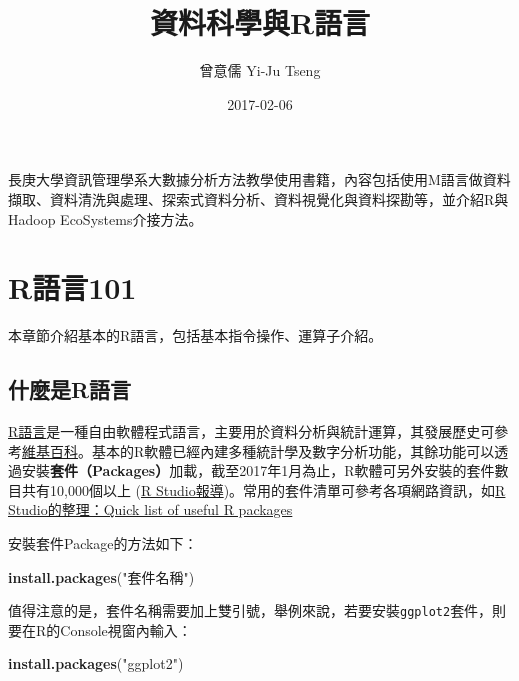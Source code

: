 \documentclass[]{book}
\title{資料科學與R語言}
\author{曾意儒 Yi-Ju Tseng}
\date{2017-02-06}
\newenvironment{Shaded}{\begin{snugshade}}{\end{snugshade}}
\newcommand{\KeywordTok}[1]{\textcolor[rgb]{0.13,0.29,0.53}{\textbf{{#1}}}}
\newcommand{\StringTok}[1]{\textcolor[rgb]{0.31,0.60,0.02}{{#1}}}
\newcommand{\NormalTok}[1]{{#1}}
\theoremstyle{definition}
\theoremstyle{definition}
\theoremstyle{remark}
\begin{document}
\maketitle

{
\setcounter{tocdepth}{1}
\tableofcontents
}
\chapter*{}\label{preface}

長庚大學資訊管理學系大數據分析方法教學使用書籍，內容包括使用M語言做資料擷取、資料清洗與處理、探索式資料分析、資料視覺化與資料探勘等，並介紹R與Hadoop
EcoSystems介接方法。

\chapter{R語言101}\label{intro}

本章節介紹基本的R語言，包括基本指令操作、運算子介紹。

\section{什麼是R語言}\label{r}

\href{http://www.r-project.org/}{R語言}是一種自由軟體程式語言，主要用於資料分析與統計運算，其發展歷史可參考\href{https://zh.wikipedia.org/wiki/R\%E8\%AF\%AD\%E8\%A8\%80}{維基百科}。基本的R軟體已經內建多種統計學及數字分析功能，其餘功能可以透過安裝\textbf{套件（Packages）}加載，截至2017年1月為止，R軟體可另外安裝的套件數目共有10,000個以上
(\href{https://www.rstudio.com/rviews/2017/01/06/10000-cran-packages/}{R
Studio報導})。常用的套件清單可參考各項網路資訊，如\href{https://support.rstudio.com/hc/en-us/articles/201057987-Quick-list-of-useful-R-packages}{R
Studio的整理：Quick list of useful R packages}

安裝套件Package的方法如下：

\begin{Shaded}
\begin{Highlighting}[]
\KeywordTok{install.packages}\NormalTok{(}\StringTok{"套件名稱"}\NormalTok{)}
\end{Highlighting}
\end{Shaded}

值得注意的是，套件名稱需要加上雙引號，舉例來說，若要安裝\texttt{ggplot2}套件，則要在R的Console視窗內輸入：

\begin{Shaded}
\begin{Highlighting}[]
\KeywordTok{install.packages}\NormalTok{(}\StringTok{"ggplot2"}\NormalTok{)}
\end{Highlighting}
\end{Shaded}
\end{document}
